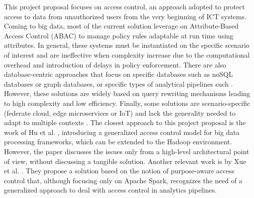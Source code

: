 This project proposal focuses on access control, an approach adopted to protect access to data from unauthorized users from the very beginning of ICT systems. Coming to big data, most of the current solution leverage on Attribute-Based Access Control (ABAC) \cite{NIST:ABAC:2014} to manage policy rules adaptable at run time using attributes. In general, these systems must be instantiated on the specific scenario of interest and are ineffective when complexity increase due to the computational overhead and introduction of delays in policy enforcement. There are also database-centric approaches that focus on specific databases such as noSQL databases or graph databases, or specific types of analytical pipelines such \cite{AConGraphDB:2021, AConMongoDB:2022, ABACforHBase:2019}. However, these solutions are widely based on query rewriting mechanisms leading to high complexity and low efficiency. Finally, some solutions are scenario-specific (federate cloud, edge microservices or IoT) and lack the generality needed to adapt to multiple contexts \cite{MultipartyAC:2019, IoTSecurity}.
The closest approach to this project proposal is the work of Hu et al. \cite{ HUFerraiolo:2014}, introducing a generalized access control model for big data processing frameworks, which can be extended to the Hadoop environment. However, the paper discusses the issues only from a high-level architectural point of view, without discussing a tangible solution. Another relevant work is by Xue et al. \cite{GuardSpark:ACSAC:2020}. They propose a solution based on the notion of purpose-aware access control \cite{Byun2008} that, although focusing only on Apache Spark, recognizes the need of a generalized approach to deal with access control in analytics pipelines.

